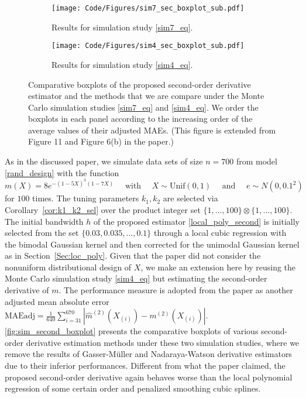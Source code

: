 \documentclass{uwstat572}
\theoremstyle{definition}
\renewcommand{\hat}{\widehat}
\theoremstyle{theorem}
\begin{document}
\begin{figure}
	\captionsetup[subfigure]{justification=centering}
	\begin{subfigure}[t]{0.49\linewidth}
		\centering
		\texttt{[image: Code/Figures/sim7\_sec\_boxplot\_sub.pdf]}
		\caption{Results for simulation study \eqref{sim7_eq}.}
	\end{subfigure}
	\hfil
	\begin{subfigure}[t]{0.49\linewidth}
		\centering
		\texttt{[image: Code/Figures/sim4\_sec\_boxplot\_sub.pdf]}
		\caption{Results for simulation study \eqref{sim4_eq}.}
	\end{subfigure}
	\caption{Comparative boxplots of the proposed second-order derivative estimator and the methods that we are compare under the Monte Carlo simulation studies \eqref{sim7_eq} and \eqref{sim4_eq}. We order the boxplots in each panel according to the increasing order of the average values of their adjusted MAEs. (This figure is extended from Figure 11 and Figure 6(b) in the paper.)}
	\label{fig:sim_second_boxplot}
\end{figure}

As in the discussed paper, we simulate data sets of size $n=700$ from model \eqref{rand_design} with the function
\begin{equation}
\label{sim7_eq}
m(X) = 8e^{-(1-5X)^3(1-7X)} \quad \text{ with } \quad X\sim \mathrm{Unif}(0,1) \quad \text{ and } \quad e\sim N(0,0.1^2)
\end{equation}
for $100$ times. The tuning parameters $k_1,k_2$ are selected via Corollary~\ref{cor:k1_k2_sel} over the product integer set $\{1,...,100\} \otimes \{1,...,100\}$. The initial bandwidth $h$ of the proposed estimator \eqref{local_poly_second} is initially selected from the set $\{0.03, 0.035,...,0.1\}$ through a local cubic regression with the bimodal Gaussian kernel and then corrected for the unimodal Gaussian kernel as in Section~\ref{Sec:loc_poly}. Given that the paper did not consider the nonuniform distributional design of $X$, we make an extension here by reusing the Monte Carlo simulation study \eqref{sim4_eq} but estimating the second-order derivative of $m$. The performance measure is adopted from the paper as another adjusted mean absolute error $\text{MAEadj}=\frac{1}{640}\sum_{i=31}^{670} \left|\hat{m}^{(2)}(X_{(i)}) - m^{(2)}(X_{(i)}) \right|$. \autoref{fig:sim_second_boxplot} presents the comparative boxplots of various second-order derivative estimation methods under these two simulation studies, where we remove the results of Gasser-M\"uller and Nadaraya-Watson derivative estimators due to their inferior performances. Different from what the paper claimed, the proposed second-order derivative again behaves worse than the local polynomial regression of some certain order and penalized smoothing cubic splines.
\end{document}
